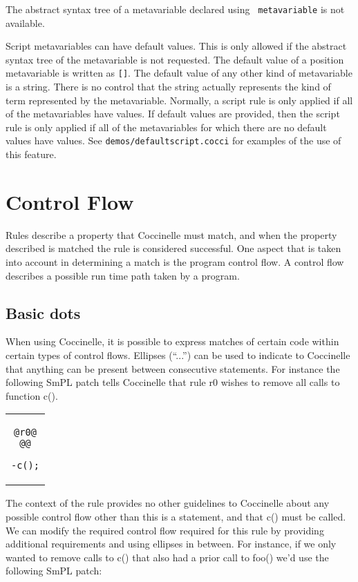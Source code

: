 The abstract syntax tree of a metavariable declared using {\tt
  metavariable} is not available.

Script metavariables can have default values.  This is only allowed if the
abstract syntax tree of the metavariable is not requested.  The default
value of a position metavariable is written as {\tt []}.  The default value
of any other kind of metavariable is a string.  There is no control that
the string actually represents the kind of term represented by the
metavariable.  Normally, a script rule is only applied if all of the
metavariables have values.  If default values are provided, then the script
rule is only applied if all of the metavariables for which there are no
default values have values.  See {\tt demos/defaultscript.cocci} for examples of
the use of this feature.

\section{Control Flow}

Rules describe a property that Coccinelle must match, and when the
property described is matched the rule is considered successful. One aspect
that is taken into account in determining a match is the program control
flow. A control flow describes a possible run time path taken by a program.

\subsection{Basic dots}
When using Coccinelle, it is possible to express matches of certain code
within certain types of control flows. Ellipses (``...'') can be used to
indicate to Coccinelle that anything can be present between consecutive
statements. For instance the following SmPL patch tells Coccinelle that
rule r0 wishes to remove all calls to function c().

\begin{center}
\begin{tabular}{c}
\begin{lstlisting}[language=Cocci]
@r0@
@@

-c();
\end{lstlisting}\\
\end{tabular}
\end{center}

The context of the rule provides no other guidelines to Coccinelle
about any possible control flow other than this is a statement, and that
c() must be called. We can modify the required control flow required for
this rule by providing additional requirements and using ellipses in between.
For instance, if we only wanted to remove calls to c() that also
had a prior call to foo() we'd use the following SmPL patch:

